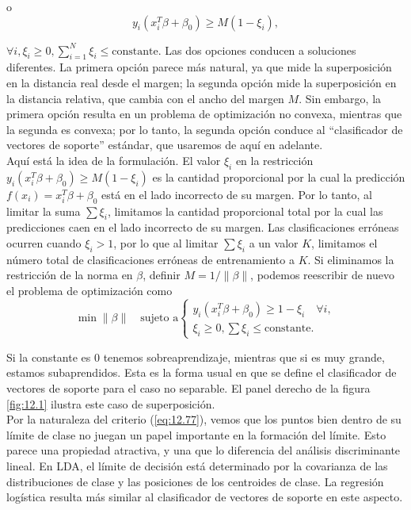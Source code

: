 \noindent o
\begin{equation}
y_i (x_i^T \beta + \beta_0) \geq M (1 - \xi_i),
\end{equation}

\noindent $\forall i, \xi_i \geq 0, \sum_{i=1}^N \xi_i \leq \text{constante}$. Las dos opciones conducen a soluciones diferentes. La primera opción parece más natural, ya que mide la superposición en la distancia real desde el margen; la segunda opción mide la superposición en la distancia relativa, que cambia con el ancho del margen $M$. Sin embargo, la primera opción resulta en un problema de optimización no convexa, mientras que la segunda es convexa; por lo tanto, la segunda opción conduce al ``clasificador de vectores de soporte'' estándar, que usaremos de aquí en adelante. \\

Aquí está la idea de la formulación. El valor $\xi_i$ en la restricción $y_i (x_i^T \beta + \beta_0) \geq M (1 - \xi_i)$ es la cantidad proporcional por la cual la predicción $f(x_i) = x_i^T \beta + \beta_0$ está en el lado incorrecto de su margen. Por lo tanto, al limitar la suma $\sum \xi_i$, limitamos la cantidad proporcional total por la cual las predicciones caen en el lado incorrecto de su margen. Las clasificaciones erróneas ocurren cuando $\xi_i > 1$, por lo que al limitar $\sum \xi_i$ a un valor $K$, limitamos el número total de clasificaciones erróneas de entrenamiento a $K$.
Si eliminamos la restricción de la norma en $\beta$, definir $M = 1/\|\beta\|$, podemos reescribir de nuevo el problema de optimización como 
\begin{equation}
\min \|\beta\| \quad \text{sujeto a}
\begin{cases}
y_i (x_i^T \beta + \beta_0) \geq 1 - \xi_i \quad \forall i, \\
\xi_i \geq 0, \sum \xi_i \leq \text{constante}.
\end{cases}
\label{eq:12.77}
\end{equation}

Si la constante es 0 tenemos sobreaprendizaje, mientras que si es muy grande, estamos subaprendidos. Esta es la forma usual en que se define el clasificador de vectores de soporte para el caso no separable. El panel derecho de la figura \ref{fig:12.1} ilustra este caso de superposición. \\

Por la naturaleza del criterio (\ref{eq:12.77}), vemos que los puntos bien dentro de su límite de clase no juegan un papel importante en la formación del límite. Esto parece una propiedad atractiva, y una que lo diferencia del análisis discriminante lineal. En LDA, el límite de decisión está determinado por la covarianza de las distribuciones de clase y las posiciones de los centroides de clase. La regresión logística resulta más similar al clasificador de vectores de soporte en este aspecto.

